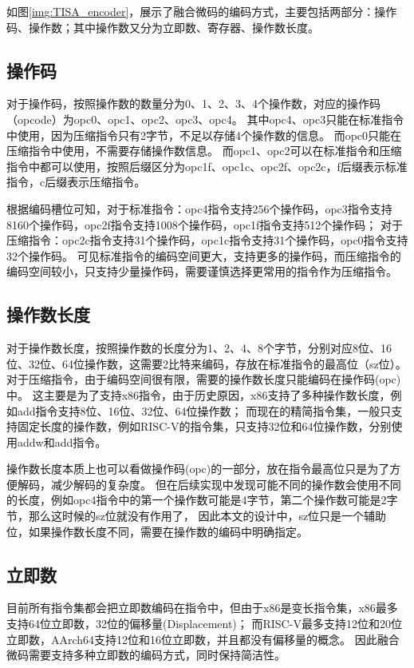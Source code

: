 如图\ref{img:TISA_encoder}，展示了融合微码的编码方式，主要包括两部分：操作码、操作数；其中操作数又分为立即数、寄存器、操作数长度。



\subsection{操作码}
对于操作码，按照操作数的数量分为0、1、2、3、4个操作数，对应的操作码（opcode）为opc0、opc1、opc2、opc3、opc4。
其中opc4、opc3只能在标准指令中使用，因为压缩指令只有2字节，不足以存储4个操作数的信息。
而opc0只能在压缩指令中使用，不需要存储操作数信息。
而opc1、opc2可以在标准指令和压缩指令中都可以使用，按照后缀区分为opc1f、opc1c、opc2f、opc2c，f后缀表示标准指令，c后缀表示压缩指令。

根据编码槽位可知，对于标准指令：opc4指令支持256个操作码，opc3指令支持8160个操作码，opc2f指令支持1008个操作码，opc1f指令支持512个操作码；
对于压缩指令：opc2c指令支持31个操作码，opc1c指令支持31个操作码，opc0指令支持32个操作码。
可见标准指令的编码空间更大，支持更多的操作码，而压缩指令的编码空间较小，只支持少量操作码，需要谨慎选择更常用的指令作为压缩指令。

\subsection{操作数长度}
对于操作数长度，按照操作数的长度分为1、2、4、8个字节，分别对应8位、16位、32位、64位操作数，这需要2比特来编码，存放在标准指令的最高位（sz位）。
对于压缩指令，由于编码空间很有限，需要的操作数长度只能编码在操作码(opc)中。
这主要是为了支持x86指令，由于历史原因，x86支持了多种操作数长度，例如add指令支持8位、16位、32位、64位操作数；
而现在的精简指令集，一般只支持固定长度的操作数，例如RISC-V的指令集，只支持32位和64位操作数，分别使用addw和add指令。

操作数长度本质上也可以看做操作码(opc)的一部分，放在指令最高位只是为了方便解码，减少解码的复杂度。
但在后续实现中发现可能不同的操作数会使用不同的长度，例如opc4指令中的第一个操作数可能是4字节，第二个操作数可能是2字节，那么这时候的sz位就没有作用了，
因此本文的设计中，sz位只是一个辅助位，如果操作数长度不同，需要在操作数的编码中明确指定。

\subsection{立即数}

目前所有指令集都会把立即数编码在指令中，但由于x86是变长指令集，x86最多支持64位立即数，32位的偏移量(Displacement)；
而RISC-V最多支持12位和20位立即数，AArch64支持12位和16位立即数，并且都没有偏移量的概念。
因此融合微码需要支持多种立即数的编码方式，同时保持简洁性。

